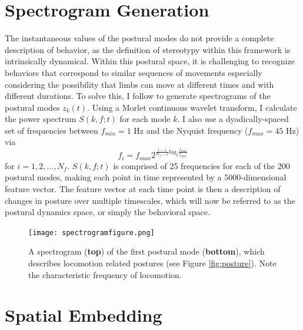 \documentclass[11pt,a4paper,oneside]{article}
\begin{document}
\begin{appendices}
\section{Spectrogram Generation}  \label{sec:spectrogramgeneration}
The instantaneous values of the postural modes do not provide a complete description of behavior, as the definition of stereotypy within this framework is intrinsically dynamical. Within this postural space, it is challenging to recognize behaviors that correspond to similar sequences of movements especially considering the possibility that limbs can move at different times and with different durations. To solve this, I  follow \cite{berman2014mapping,berman2014drosopholid} to generate spectrograms of the postural modes $z_k(t)$. Using a Morlet continuous wavelet transform, I calculate the power spectrum $S(k,f;t)$ for each mode $k$. I also use a dyadically-spaced set of frequencies between $f_{min} = 1$ Hz and the Nyquist frequency ($f_{max} = 45$ Hz) via
\begin{equation}
f_i = f_{max}2^{\frac{i-1}{N_{f}-1}log_2\frac{f_{max}}{f_{min}}}
\end{equation}
for $i = 1, 2, \ldots , N_f$. $S(k,f;t)$ is comprised of 25 frequencies for each of the 200 postural modes, making each point in time represented by a 5000-dimensional feature vector. The feature vector at each time point is then a description of changes in posture over multiple timescales, which will now be referred to as the postural dynamics space, or simply the behavioral space.

\begin{figure}
	\begin{center}
		\texttt{[image: spectrogramfigure.png]}\\
	\end{center}
	\begin{flushleft}
		\caption{A spectrogram (\textbf{top}) of the first postural mode (\textbf{bottom}), which describes locomotion related postures (see Figure \ref{fig:posture}). Note the characteristic frequency of locomotion. \label{fig:spectrogram}} 
	\end{flushleft}
\end{figure} 

\section{Spatial Embedding} \label{sec:spatialembedding}


\end{appendices}
\end{document}
